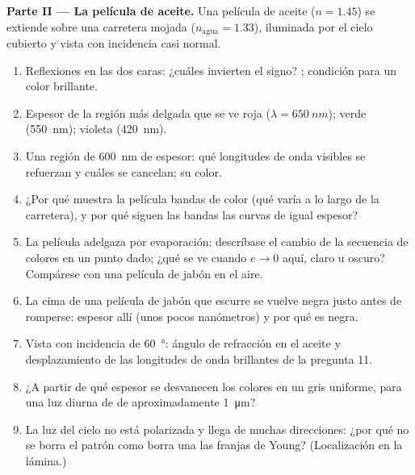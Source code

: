 \begin{problem}
\medskip
\noindent\textbf{Parte II --- La película de aceite.}
Una película de aceite ($n = 1.45$) se extiende sobre una carretera mojada ($n_{\text{agua}} = 1.33$),
iluminada por el cielo cubierto y vista con incidencia casi normal.
\begin{enumerate}[resume]
  \item Reflexiones en las dos caras: ¿cuáles invierten el signo? ; condición para un color brillante.
  \item Espesor de la región más delgada que se ve roja ($\lambda =
        \qty{650}{nm}$); verde (\qty{550}{nm}); violeta (\qty{420}{nm}).
  \item Una región de \qty{600}{nm} de espesor: qué longitudes de onda visibles se
        refuerzan y cuáles se cancelan; su color.
  \item ¿Por qué muestra la película bandas de color (qué varía a lo largo de la
        carretera), y por qué siguen las bandas las curvas de igual espesor?
  \item La película adelgaza por evaporación: descríbase el cambio de la
        secuencia de colores en un punto dado; ¿qué se ve cuando $e \to 0$
        aquí, claro u oscuro? Compárese con una película de jabón en el aire.
  \item La cima de una película de jabón que escurre se vuelve negra justo antes de
        romperse: espesor allí (unos pocos nanómetros) y por qué es negra.
  \item Vista con incidencia de \qty{60}{\degree}: ángulo de refracción en el aceite
        y desplazamiento de las longitudes de onda brillantes de la pregunta 11.
  \item ¿A partir de qué espesor se desvanecen los colores en un gris
        uniforme, para una luz diurna de  de aproximadamente \qty{1}{\micro m}?
  \item La luz del cielo no está polarizada y llega de muchas
        direcciones: ¿por qué no se borra el patrón como borra una  las franjas de Young? (Localización en la lámina.)
\end{enumerate}


\end{problem}
